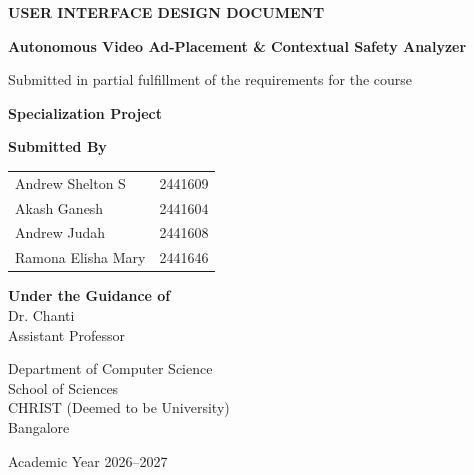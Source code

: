\documentclass[12pt,a4paper,twoside]{article}
\begin{document}

\begin{titlepage}
\thispagestyle{empty}

\begin{center}

{\Large\textbf{USER INTERFACE DESIGN DOCUMENT}}
\vspace{1cm}

{\Huge\textbf{Autonomous Video Ad-Placement \& Contextual Safety Analyzer}}\vspace{1.5cm}

Submitted in partial fulfillment of the requirements for the course

\vspace{0.5cm}

{\Large\textbf{Specialization Project}}

\vspace{1cm}

\textbf{Submitted By}

\vspace{0.5cm}

\begin{tabular}{ll}
Andrew Shelton S & 2441609\\
Akash Ganesh & 2441604\\
Andrew Judah & 2441608\\
Ramona Elisha Mary & 2441646\\
\end{tabular}

\vfill

\textbf{Under the Guidance of}\\[0.3cm]

Dr. Chanti\\
Assistant Professor

\vfill

Department of Computer Science\\
School of Sciences\\
CHRIST (Deemed to be University)\\
Bangalore

\vfill

Academic Year 2026--2027

\end{center}
\end{titlepage}

\end{document}
